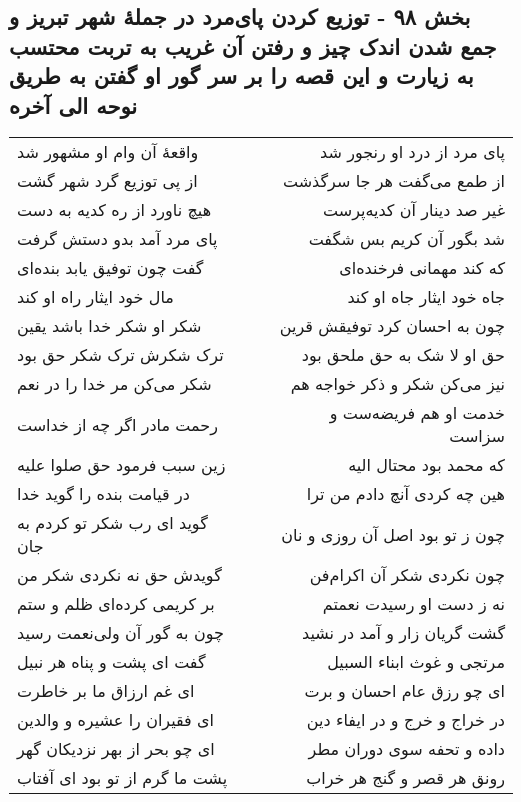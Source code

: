 \begin{center}
\section*{بخش ۹۸ - توزیع کردن پای‌مرد در جملهٔ شهر تبریز و جمع شدن اندک چیز و رفتن آن غریب به تربت محتسب به زیارت و این قصه را بر سر گور او گفتن به طریق نوحه الی آخره}
\label{sec:sh098}
\begin{longtable}{l p{0.5cm} r}
واقعهٔ آن وام او مشهور شد
&&
پای مرد از درد او رنجور شد
\\
از پی توزیع گرد شهر گشت
&&
از طمع می‌گفت هر جا سرگذشت
\\
هیچ ناورد از ره کدیه به دست
&&
غیر صد دینار آن کدیه‌پرست
\\
پای مرد آمد بدو دستش گرفت
&&
شد بگور آن کریم بس شگفت
\\
گفت چون توفیق یابد بنده‌ای
&&
که کند مهمانی فرخنده‌ای
\\
مال خود ایثار راه او کند
&&
جاه خود ایثار جاه او کند
\\
شکر او شکر خدا باشد یقین
&&
چون به احسان کرد توفیقش قرین
\\
ترک شکرش ترک شکر حق بود
&&
حق او لا شک به حق ملحق بود
\\
شکر می‌کن مر خدا را در نعم
&&
نیز می‌کن شکر و ذکر خواجه هم
\\
رحمت مادر اگر چه از خداست
&&
خدمت او هم فریضه‌ست و سزاست
\\
زین سبب فرمود حق صلوا علیه
&&
که محمد بود محتال الیه
\\
در قیامت بنده را گوید خدا
&&
هین چه کردی آنچ دادم من ترا
\\
گوید ای رب شکر تو کردم به جان
&&
چون ز تو بود اصل آن روزی و نان
\\
گویدش حق نه نکردی شکر من
&&
چون نکردی شکر آن اکرام‌فن
\\
بر کریمی کرده‌ای ظلم و ستم
&&
نه ز دست او رسیدت نعمتم
\\
چون به گور آن ولی‌نعمت رسید
&&
گشت گریان زار و آمد در نشید
\\
گفت ای پشت و پناه هر نبیل
&&
مرتجی و غوث ابناء السبیل
\\
ای غم ارزاق ما بر خاطرت
&&
ای چو رزق عام احسان و برت
\\
ای فقیران را عشیره و والدین
&&
در خراج و خرج و در ایفاء دین
\\
ای چو بحر از بهر نزدیکان گهر
&&
داده و تحفه سوی دوران مطر
\\
پشت ما گرم از تو بود ای آفتاب
&&
رونق هر قصر و گنج هر خراب
\\

\end{longtable}
\end{center}
